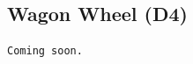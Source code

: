 \documentclass[article,A4,12pt]{llncs}
\begin{document}
\subsection{Wagon Wheel (D4)}

\begin{verbatim}
Coming soon.
\end{verbatim}
\end{document}
